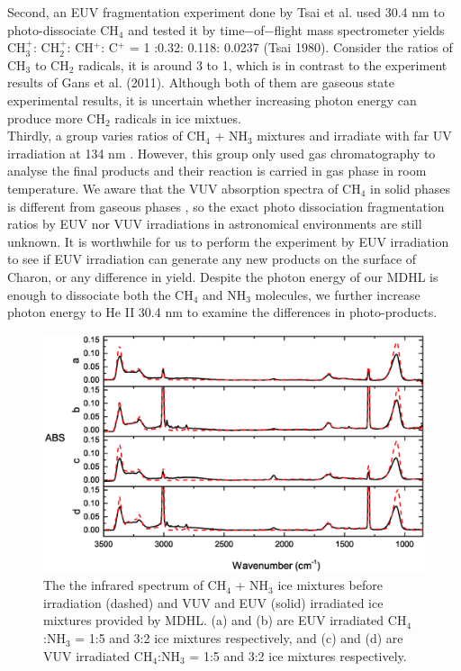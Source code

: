 Second, an EUV fragmentation experiment done by Tsai et al. \cite{tsai1980mass} used 30.4 nm to photo-dissociate CH$_4$ and tested it by time$-$of$-$flight mass spectrometer yields CH$_3^+$: CH$_2^+$: CH$^+$: C$^+$ = 1 :0.32: 0.118: 0.0237 (Tsai 1980). Consider the ratios of CH$_3$ to CH$_2$ radicals, it is around 3 to 1, which is in contrast to the experiment results of Gans et al. (2011)\cite{gans2011photolysis}. Although both of them are gaseous state experimental results, it is uncertain whether increasing photon energy can produce more CH$_2$ radicals in ice mixtues.\\

Thirdly, a group varies ratios of CH$_4$ + NH$_3$ mixtures and irradiate with far UV irradiation at 134 nm \cite{bossard1980far}. However, this group only used gas chromatography to analyse the final products and their reaction is carried in gas phase in room temperature. We aware that the VUV absorption spectra of CH$_4$ in solid phases is different from gaseous phases \cite{cruz2014vacuum}, so the exact photo dissociation fragmentation ratios by EUV nor VUV irradiations in astronomical environments are still unknown. It is worthwhile for us to perform the experiment by EUV irradiation to see if  EUV irradiation can generate any new products on the surface of Charon, or any difference in yield. Despite the photon energy of our MDHL is enough to dissociate both the CH$_4$ and NH$_3$ molecules, we further increase photon energy to He II 30.4 nm to examine the differences in photo-products. \\

\begin{figure}
\centering
\includegraphics[width=\textwidth]{figures/chapter3/NSRRC_MDHL_IR.eps}
\caption{The the infrared spectrum of CH$_4$ + NH$_3$ ice mixtures before irradiation (dashed) and VUV and EUV (solid) irradiated ice mixtures provided by MDHL. (a) and (b) are EUV irradiated CH$_4$:NH$_3$ = 1:5 and 3:2 ice mixtures respectively, and (c) and (d) are VUV irradiated CH$_4$:NH$_3$ = 1:5 and 3:2 ice mixtures respectively.}
\label{fig:NSRRC_MDHL_IR}
\end{figure}

